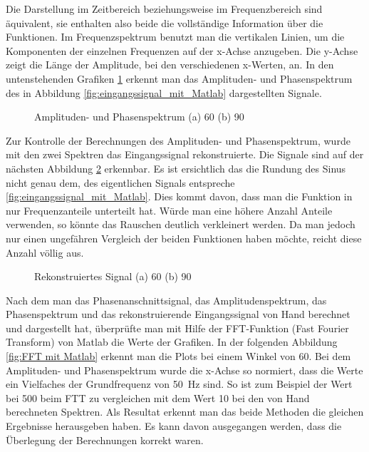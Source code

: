 \newpage
Die Darstellung im Zeitbereich beziehungsweise im Frequenzbereich sind äquivalent, sie enthalten also beide die vollständige Information über die Funktionen. Im Frequenzspektrum benutzt man die vertikalen Linien, um die Komponenten der einzelnen Frequenzen auf der x-Achse anzugeben. Die y-Achse zeigt die Länge der Amplitude, bei den verschiedenen x-Werten, an. In den untenstehenden Grafiken \ref{fig:Amplituden- und Phasenspektrum} erkennt man das Amplituden- und Phasenspektrum des in Abbildung \ref{fig:eingangssignal_mit_Matlab} dargestellten Signale.

\begin{figure}[h]
	\centering
	\qquad
	\caption{Amplituden- und Phasenspektrum (a) 60\textdegree \hspace{0.02cm} (b) 90\textdegree}
	\label{fig:Amplituden- und Phasenspektrum}
\end{figure} 

Zur Kontrolle der Berechnungen des Amplituden- und Phasenspektrum, wurde mit den zwei Spektren das Eingangssignal rekonstruierte. Die Signale sind auf der nächsten Abbildung \ref{fig:Rekonstruiertes Signal} erkennbar. Es ist ersichtlich das die Rundung des Sinus nicht genau dem, des eigentlichen Signals entspreche \ref{fig:eingangssignal_mit_Matlab}. Dies kommt davon, dass man die Funktion in \grqq nur Frequenzanteile unterteilt hat. Würde man eine höhere Anzahl Anteile verwenden, so könnte das Rauschen deutlich verkleinert werden. Da man jedoch nur einen ungefähren Vergleich der beiden Funktionen haben möchte, reicht diese Anzahl völlig aus. 

\begin{figure}[h]
	\centering
	\qquad
	\caption{Rekonstruiertes Signal (a) 60\textdegree \hspace{0.02cm} (b) 90\textdegree}
	\label{fig:Rekonstruiertes Signal}
\end{figure} 


Nach dem man das Phasenanschnittsignal, das Amplitudenspektrum,  das Phasenspektrum und das rekonstruierende Eingangssignal von Hand berechnet und dargestellt hat, überprüfte man mit Hilfe der FFT-Funktion (Fast Fourier Transform) von Matlab die Werte der Grafiken. In der folgenden Abbildung \ref{fig:FFT mit Matlab} erkennt man die Plots bei einem Winkel von 60\textdegree \hspace{0.02cm}. Bei dem Amplituden- und Phasenspektrum wurde die x-Achse so normiert, dass die Werte ein Vielfaches der Grundfrequenz von \SI{50}{Hz} sind. So ist zum Beispiel der Wert bei 500 beim FTT zu vergleichen mit dem Wert 10 bei den von Hand berechneten Spektren. Als Resultat erkennt man das beide Methoden die gleichen Ergebnisse herausgeben haben. Es kann davon ausgegangen werden, dass die Überlegung der Berechnungen korrekt waren.

